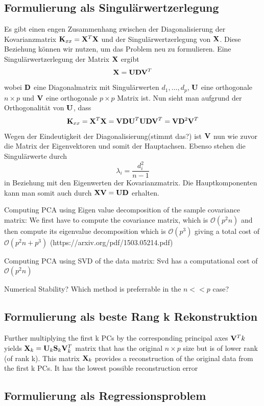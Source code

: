 \subsection{Formulierung als Singulärwertzerlegung}
Es gibt einen engen Zusammenhang zwischen der Diagonalisierung der Kovarianzmatrix $\mathbf{K}_{xx} = \mathbf{X}^T \mathbf{X}$ und der Singulärwertzerlegung von $\mathbf{X}$. Diese Beziehung können wir nutzen, um das Problem neu zu formulieren. Eine Singulärwertzerlegung der Matrix $\mathbf{X}$ ergibt
$$ \mathbf{X} = \mathbf{U}\mathbf{D}\mathbf{V}^T $$
wobei $\mathbf{D}$ eine Diagonalmatrix mit Singulärwerten $d_1,\ldots,d_p$, $\mathbf{U}$ eine orthogonale $n \times p$ und $\mathbf{V}$ eine orthogonale $p \times p$ Matrix ist. Nun sieht man aufgrund der Orthogonalität von $\mathbf{U}$, dass
$$\mathbf{K}_{xx} = \mathbf{X}^T \mathbf{X} = \mathbf{V}\mathbf{D}\mathbf{U}^T \mathbf{U}\mathbf{D}\mathbf{V}^T = \mathbf{V} \mathbf{D}^2 \mathbf{V}^T$$
Wegen der Eindeutigkeit der Diagonalisierung(stimmt das?) ist $\mathbf{V}$ nun wie zuvor die Matrix der Eigenvektoren und somit der Hauptachsen. Ebenso stehen die Singulärwerte durch 
$$\lambda_i = \frac{d_i^2}{n-1}$$
in Beziehung mit den Eigenwerten der Kovarianzmatrix. Die Hauptkomponenten kann man somit auch durch $\mathbf{X} \mathbf{V} = \mathbf{U} \mathbf{D}$ erhalten.

Computing PCA using Eigen value decomposition of the sample covariance matrix:
We first have to compute the covariance matrix, which is $\mathcal{O}(p^2n)$ and then compute its eigenvalue decomposition which is $\mathcal{O}(p^3)$ giving a total cost of $\mathcal{O}(p^2n+p^3)$ (https://arxiv.org/pdf/1503.05214.pdf)

Computing PCA using SVD of the data matrix:
Svd has a computational cost of $\mathcal{O}(p^2n)$

Numerical Stability? Which method is preferrable in the $n << p$ case?


\subsection{Formulierung als beste Rang k Rekonstruktion}
Further multiplying the first k PCs by the corresponding principal axes $\mathbf{V}^T k$ yields $\mathbf{X}_k = \mathbf{U}_k \mathbf{S}_k \mathbf{V}_k^T$ matrix that has the original $n \times p$ size but is of lower rank (of rank k). This matrix $\mathbf{X}_k$ provides a reconstruction of the original data from the first k PCs. It has the lowest possible reconstruction error


\subsection{Formulierung als Regressionsproblem}

